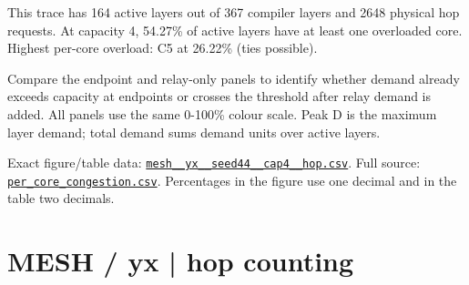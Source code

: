 \documentclass[10pt,a4paper]{article}
\begin{document}
This trace has 164 active layers out of 367 compiler layers and 2648 physical hop requests. At capacity 4, 54.27\% of active layers have at least one overloaded core. Highest per-core overload: C5 at 26.22\% (ties possible).\par
Compare the endpoint and relay-only panels to identify whether demand already exceeds capacity at endpoints or crosses the threshold after relay demand is added. All panels use the same 0-100\% colour scale. Peak D is the maximum layer demand; total demand sums demand units over active layers.\par
Exact figure/table data: \href{\detokenize{file:///home/dhruv-pansuriya/Documents/BTP/Compiler-Driven-ACE/output/pdf/qaoa_methods_congestion/tables/mesh__yx__seed44__cap4__hop.csv}}{\nolinkurl{mesh__yx__seed44__cap4__hop.csv}}. Full source: \href{\detokenize{file:///home/dhruv-pansuriya/Documents/BTP/Compiler-Driven-ACE/results/qaoa_2seed_2026-10-26/congestion/per_core_congestion.csv}}{\nolinkurl{per_core_congestion.csv}}. Percentages in the figure use one decimal and in the table two decimals.\par
\clearpage
\section*{MESH / yx | hop counting}
\end{document}
